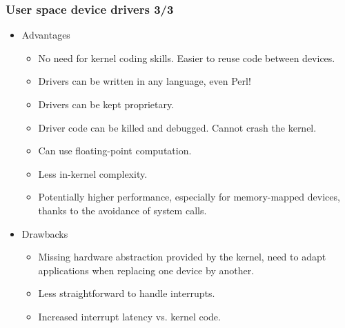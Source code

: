\begin{frame}
  \frametitle{User space device drivers 3/3}
  \begin{itemize}
  \item Advantages
    \begin{itemize}
    \item No need for kernel coding skills. Easier to reuse code
      between devices.
    \item Drivers can be written in any language, even Perl!
    \item Drivers can be kept proprietary.
    \item Driver code can be killed and debugged. Cannot crash the
      kernel.
    \item Can use floating-point computation.
    \item Less in-kernel complexity.
    \item Potentially higher performance, especially for
      memory-mapped devices, thanks to the avoidance of system calls.
    \end{itemize}
  \item Drawbacks
    \begin{itemize}
    \item Missing hardware abstraction provided by the kernel, need
          to adapt applications when replacing one device by another.
    \item Less straightforward to handle interrupts.
    \item Increased interrupt latency vs. kernel code.
    \end{itemize}
  \end{itemize}
\end{frame}
